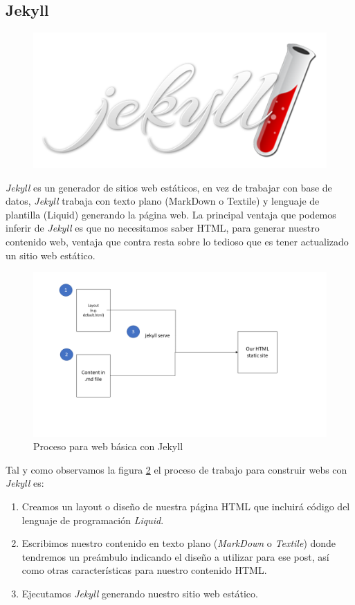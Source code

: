\documentclass[a4paper, 12pt]{book}
\begin{document}
\subsection*{Jekyll}
\label{subsec:jekyll}
\begin{figure}[h]
    \centering
    \includegraphics[scale=0.3]{img/logo_jekyll.png}
    \label{img:logoJekyll}
\end{figure}
\emph{Jekyll} es un generador de sitios web estáticos, en vez de trabajar con base de datos, \emph{Jekyll} trabaja con texto plano (MarkDown o Textile) y lenguaje de plantilla (Liquid)  generando la página web. La principal ventaja que podemos inferir de \emph{Jekyll} es que no necesitamos saber HTML, para generar nuestro contenido web, ventaja que contra resta sobre lo tedioso que es tener actualizado un sitio web estático. \\
\begin{figure}[H]
    \centering
    \includegraphics[width=\textwidth]{img/jeyll_process.png}
    \caption{Proceso para web básica con Jekyll}
    \label{fig:jekyllProc}
\end{figure}
Tal y como observamos la figura \ref{fig:jekyllProc} el proceso de trabajo para construir webs con \emph{Jekyll} es:
\begin{enumerate}
    \item Creamos un layout o diseño de nuestra página HTML que incluirá  código del lenguaje de programación \emph{Liquid}.
    \item Escribimos nuestro contenido en texto plano (\emph{MarkDown} o \emph{Textile}) donde tendremos un preámbulo indicando el diseño a utilizar para ese post, así como otras características para nuestro contenido HTML.
    \item Ejecutamos \emph{Jekyll} generando nuestro sitio web estático.
\end{enumerate}
\end{document}
